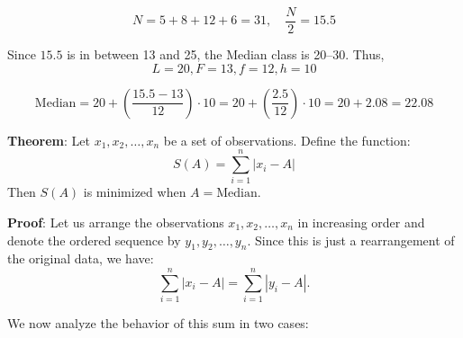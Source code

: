 \documentclass[twoside]{book}
\begin{document}
\begin{enumerate}
\[
N = 5 + 8 + 12 + 6 = 31,\quad \frac{N}{2} = 15.5
\]

Since $15.5$ is in between 13 and 25, the Median class is 20--30. Thus,
$$L = 20, F = 13, f = 12, h = 10$$

\[
\text{Median} = 20 + \left( \frac{15.5 - 13}{12} \right) \cdot 10 = 20 + \left( \frac{2.5}{12} \right) \cdot 10 = 20 + 2.08 = 22.08
\]
\end{enumerate}

\begin{textbox}
\textbf{Theorem}: Let \( x_1, x_2, \ldots, x_n \) be a set of observations. Define the function:
\[
S(A) = \sum_{i=1}^n |x_i - A|
\]
Then \( S(A) \) is minimized when \( A = \text{Median} \).
\end{textbox}
\textbf{Proof}: Let us arrange the observations \( x_1, x_2, \ldots, x_n \) in increasing order and denote the ordered sequence by \( y_1, y_2, \ldots, y_n \). Since this is just a rearrangement of the original data, we have:
\[
\sum_{i=1}^n |x_i - A| = \sum_{i=1}^n |y_i - A|.
\]

We now analyze the behavior of this sum in two cases:
\end{document}
